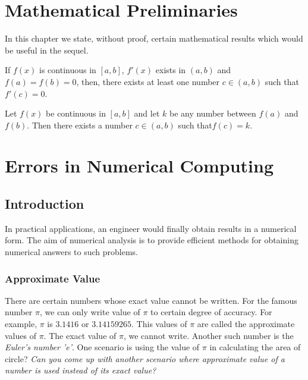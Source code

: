 \documentclass[aima203_lecturenotes_ku.tex]{subfiles}
\begin{document}
\chapter*{Mathematical Preliminaries}
In this chapter we state, without proof, certain mathematical results which would be useful in the sequel.


\begin{theorem}
  If \(f(x)\) is continuous in \([a,b]\), \(f'(x)\) exists in \((a,b)\) and \(f(a)=f(b)=0\), then, there exists at least one number \(c \in (a,b)\) such that \(f'(c)=0\).
\end{theorem}

\begin{theorem}
  Let \(f(x)\) be continuous in \([a,b]\) and let \(k\) be any number between \(f(a)\) and \(f(b)\). Then there exists a number \(c \in (a,b)\) such that\(f(c)=k\).
\end{theorem}

\chapter{Errors in Numerical Computing}

\section{Introduction}
In practical applications, an engineer would finally obtain results in a numerical form. The aim of numerical analysis is to provide efficient methods for obtaining numerical answers to such problems.

\subsection{Approximate Value}
There are certain numbers whose exact value cannot be written. For the famous number \(\pi\), we can only write value of \(\pi\) to certain degree of accuracy. For example, \(\pi\) is \(3.1416\) or \(3.14159265\). This values of \(\pi\) are called the approximate values of \(\pi\). The exact value of \(\pi\), we cannot write. Another such number is the \textit{Euler's number 'e'}. One scenario is using the value of $\pi$ in calculating the area of circle? \textit{Can you come up with another scenario where approximate value of a number is used instead of its exact value?}
\end{document}
